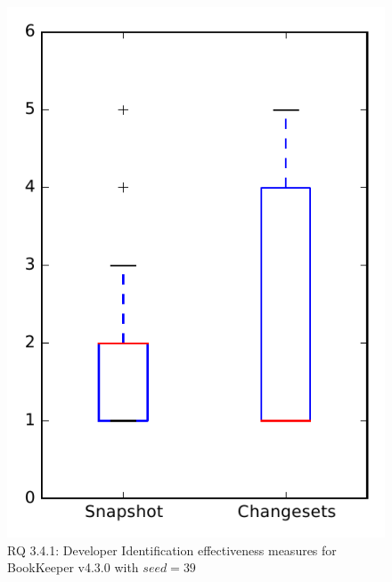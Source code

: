 
\begin{figure}
\centering
\includegraphics[height=0.4\textheight]{figures/dit_seed/rq1_bookkeeper_39}
\caption{RQ 3.4.1: Developer Identification effectiveness measures for BookKeeper v4.3.0 with $seed=39$}
\label{fig:dit_seed:rq1:bookkeeper}
\end{figure}
